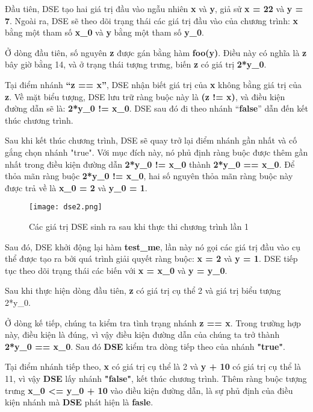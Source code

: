 Đầu tiên, DSE tạo hai giá trị đầu vào ngẫu nhiên \textbf{x} và \textbf{y}, giả sử \textbf{x = 22} và \textbf{y = 7}. Ngoài ra, DSE sẽ theo dõi trạng thái các giá trị đầu vào của chương trình: \textbf{x} bằng một tham số \textbf{x\_0} và \textbf{y} bằng một tham số \textbf{y\_0}.

Ở dòng đầu tiên, số nguyên \textbf{z} được gán bằng hàm \textbf{foo(y)}. Điều này có nghĩa là \textbf{z} bây giờ bằng 14, và ở trạng thái tượng trưng, biến \textbf{z} có giá trị \textbf{2*y\_0}. 

Tại điểm nhánh \textbf{“z == x”}, DSE nhận biết giá trị của \textbf{x} không bằng giá trị của \textbf{z}. Về mặt biểu tượng, DSE lưu trữ ràng buộc này là \textbf{(z != x)}, và điều kiện đường dẫn sẽ là: \textbf{2*y\_0 != x\_0}. DSE sau đó đi theo nhánh “\textbf{false}” dẫn đến kết thúc chương trình.

Sau khi kết thúc chương trình, DSE sẽ quay trở lại điểm nhánh gần nhất và cố gắng chọn nhánh "true". Với mục đích này, nó phủ định ràng buộc được thêm gần nhất trong điều kiện đường dẫn \textbf{2*y\_0 != x\_0} thành \textbf{2*y\_0 == x\_0}. Để thỏa mãn ràng buộc \textbf{2*y\_0 != x\_0}, hai số nguyên thỏa mãn ràng buộc này được trả về là \textbf{x\_0 = 2 }và\textbf{ y\_0 = 1}.


\begin{center}
	\begin{figure}[htp]
		\begin{center}
			\texttt{[image: dse2.png]}
		\end{center}
		\caption{Các giá trị DSE sinh ra sau khi thực thi chương trình lần 1}
		\label{refhinh1}
	\end{figure}
\end{center}

Sau đó, DSE khởi động lại hàm \textbf{test\_me}, lần này nó gọi các giá trị đầu vào cụ thể được tạo ra bởi quá trình giải quyết ràng buộc: \textbf{x = 2} và \textbf{y = 1}. DSE tiếp tục theo dõi trạng thái các biến với \textbf{x = x\_0} và \textbf{y = y\_0}.

Sau khi thực hiện dòng đầu tiên, \textbf{z} có giá trị cụ thể 2 và giá trị biểu tượng 2*y\_0\textbf{}.

Ở dòng kế tiếp, chúng ta kiểm tra tình trạng nhánh \textbf{z == x}. Trong trường hợp này, điều kiện là đúng, vì vậy điều kiện đường dẫn của chúng ta trở thành \textbf{2*y\_0 == x\_0}. Sau đó \textbf{DSE} kiểm tra dòng tiếp theo của nhánh \textbf{"true"}.

Tại điểm nhánh tiếp theo, \textbf{x} có giá trị cụ thể là 2 và \textbf{y + 10} có giá trị cụ thể là 11, vì vậy \textbf{DSE} lấy nhánh \textbf{"false"}, kết thúc chương trình. Thêm ràng buộc tượng trưng \textbf{x\_0 <= y\_0 + 10} vào điều kiện đường dẫn, là sự phủ định của điều kiện nhánh mà \textbf{DSE} phát hiện là \textbf{fasle}.

